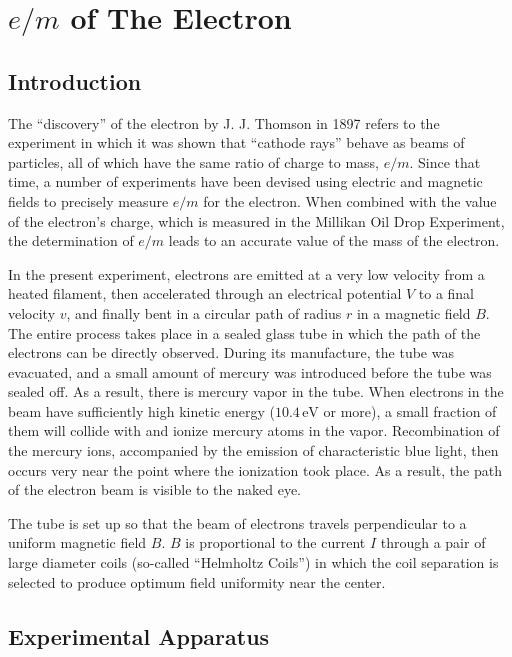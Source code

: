\chapter{$e/ m$ of The Electron}
\section{Introduction}
The ``discovery'' of the electron by J. J. Thomson in 1897 refers to the experiment in which it was shown that ``cathode rays'' behave as beams of particles, all of which have the same ratio of charge to mass, $e/m$. Since that time, a number of experiments have been devised using electric and magnetic fields to precisely measure $e/m$ for the electron. When combined with the value of the electron's charge, which is measured in the Millikan Oil Drop Experiment, the determination of $e/m$ leads to an accurate value of the mass of the electron.\myskip

In the present experiment, electrons are emitted at a very low velocity from a heated filament, then accelerated through an electrical potential $V$ to a final velocity $v$, and finally bent in a circular path of radius $r$ in a magnetic field $B$. The entire process takes place in a sealed glass tube in which the path of the electrons can be directly observed. During its manufacture, the tube was evacuated, and a small amount of mercury was introduced before the tube was sealed off. As a result, there is mercury vapor in the tube. When electrons in the beam have sufficiently high kinetic energy ($10.4\,\mathrm{eV}$ or more), a small fraction of them will collide with and ionize mercury atoms in the vapor. Recombination of the mercury ions, accompanied by the emission of characteristic blue light, then occurs very near the point where the ionization took place. As a result, the path of the electron beam is visible to the naked eye. \myskip

The tube is set up so that the beam of electrons travels perpendicular to a uniform magnetic field $B$. $B$ is proportional to the current $I$ through a pair of large diameter coils (so-called ``Helmholtz Coils'') in which the coil separation is selected to produce optimum field uniformity near the center.

\section{Experimental Apparatus}
